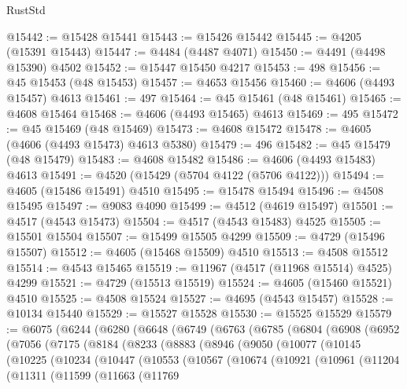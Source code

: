 \begin{lexlean}{RustStd}
\begin{coremodule}
@15442 := @15428 @15441
@15443 := @15426 @15442
@15445 := @4205 (@15391 @15443)
@15447 := @4484 (@4487 @4071)
@15450 := @4491 (@4498 @15390) @4502
@15452 := @15447 @15450 @4217
@15453 := 498
@15456 := @45 @15453 (@48 @15453)
@15457 := @4653 @15456
@15460 := @4606 (@4493 @15457) @4613
@15461 := 497
@15464 := @45 @15461 (@48 @15461)
@15465 := @4608 @15464
@15468 := @4606 (@4493 @15465) @4613
@15469 := 495
@15472 := @45 @15469 (@48 @15469)
@15473 := @4608 @15472
@15478 := @4605 (@4606 (@4493 @15473) @4613 @5380)
@15479 := 496
@15482 := @45 @15479 (@48 @15479)
@15483 := @4608 @15482
@15486 := @4606 (@4493 @15483) @4613
@15491 := @4520 (@15429 (@5704 @4122 (@5706 @4122)))
@15494 := @4605 (@15486 @15491) @4510
@15495 := @15478 @15494
@15496 := @4508 @15495
@15497 := @9083 @4090
@15499 := @4512 (@4619 @15497)
@15501 := @4517 (@4543 @15473)
@15504 := @4517 (@4543 @15483) @4525
@15505 := @15501 @15504
@15507 := @15499 @15505 @4299
@15509 := @4729 (@15496 @15507)
@15512 := @4605 (@15468 @15509) @4510
@15513 := @4508 @15512
@15514 := @4543 @15465
@15519 := @11967 (@4517 (@11968 @15514) @4525) @4299
@15521 := @4729 (@15513 @15519)
@15524 := @4605 (@15460 @15521) @4510
@15525 := @4508 @15524
@15527 := @4695 (@4543 @15457)
@15528 := @10134 @15440
@15529 := @15527 @15528
@15530 := @15525 @15529
@15579 := @6075
    (@6244
      (@6280
        (@6648
          (@6749
            (@6763
              (@6785
                (@6804
                  (@6908
                    (@6952
                      (@7056
                        (@7175
                          (@8184
                            (@8233
                              (@8883
                                (@8946
                                  (@9050
                                    (@10077
                                      (@10145
                                        (@10225
                                          (@10234
                                            (@10447
                                              (@10553
                                                (@10567
                                                  (@10674
                                                    (@10921
                                                      (@10961
                                                        (@11204
                                                          (@11311
                                                            (@11599
                                                              (@11663
                                                                (@11769

\end{coremodule}
\end{lexlean}
